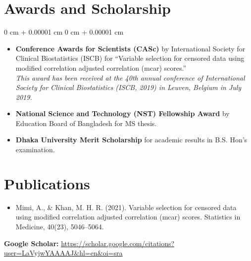 \documentclass[10pt, letterpaper]{article}
\newenvironment{highlights}{
    \begin{itemize}[
        topsep=0.10 cm,
        parsep=0.10 cm,
        partopsep=0pt,
        itemsep=0pt,
        leftmargin=0 cm + 10pt
    ]
}{
    \end{itemize}
} %
\newenvironment{onecolentry}{
    \begin{adjustwidth}{
        0 cm + 0.00001 cm
    }{
        0 cm + 0.00001 cm
    }
}{
    \end{adjustwidth}
} %
\begin{document}
    \section{Awards and Scholarship}
        \vspace{0.10 cm}
        \begin{onecolentry}
            \begin{highlights}
                \item \textbf{Conference Awards for Scientists (CASc)} by International Society for Clinical Biostatistics (ISCB) for “Variable selection for censored data using modified correlation adjusted correlation (mcar) scores.” \\
                \textit{This award has been received at the 40th annual conference of International Society for Clinical Biostatistics (ISCB, 2019) in Leuven, Belgium in July 2019.}
                \item \textbf{National Science and Technology (NST) Fellowship Award} by Education Board of Bangladesh for MS thesis.
                \item \textbf{Dhaka University Merit Scholarship} for academic results in B.S. Hon’s examination.
            \end{highlights}
        \end{onecolentry}


    \section{Publications}
        
        \begin{itemize}
            \item Mimi, A., \& Khan, M. H. R. (2021). Variable selection for censored data using modified correlation adjusted correlation (mcar) scores. Statistics in Medicine, 40(23), 5046–5064.     
           

        \end{itemize}
        \textbf{Google Scholar:} \href{https://scholar.google.com/citations?user=LaVyjwYAAAAJ&hl=en&oi=sra}{https://scholar.google.com/citations?user=LaVyjwYAAAAJ\&hl=en\&oi=sra}
\end{document}
